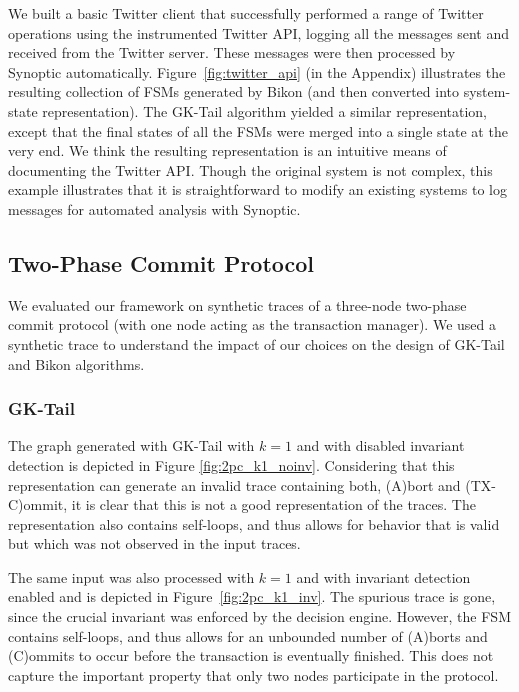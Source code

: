 
We built a basic Twitter client that successfully performed a range of
Twitter operations using the instrumented Twitter API, logging all the
messages sent and received from the Twitter server. These messages were
then processed by Synoptic automatically. Figure~\ref{fig:twitter_api}
(in the Appendix) illustrates the resulting collection of FSMs
generated by Bikon (and then converted into system-state
representation). The GK-Tail algorithm yielded a similar
representation, except that the final states of all the FSMs were
merged into a single state at the very end. We think the resulting
representation is an intuitive means of documenting the Twitter
API. Though the original system is not complex, this example
illustrates that it is straightforward to modify an existing systems
to log messages for automated analysis with Synoptic.

\subsection{Two-Phase Commit Protocol}

We evaluated our framework on synthetic traces of a three-node
two-phase commit protocol (with one node acting as the transaction
manager). We used a synthetic trace to understand the impact of our
choices on the design of GK-Tail and Bikon algorithms.

\subsubsection{GK-Tail}

The graph generated with GK-Tail with $k=1$ and with disabled
invariant detection is depicted in Figure
\ref{fig:2pc_k1_noinv}. Considering that this representation can
generate an invalid trace containing both, (A)bort and (TX-C)ommit, it
is clear that this is not a good representation of the traces. The
representation also contains self-loops, and thus allows for behavior
that is valid but which was not observed in the input traces.

The same input was also processed with $k=1$ and with invariant
detection enabled and is depicted in Figure~\ref{fig:2pc_k1_inv}. The
spurious trace is gone, since the crucial invariant was enforced by
the decision engine. However, the FSM contains self-loops, and thus
allows for an unbounded number of (A)borts and (C)ommits to occur
before the transaction is eventually finished. This does not capture
the important property that only two nodes participate in the
protocol.

